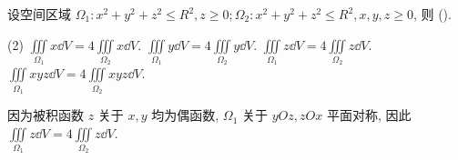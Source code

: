 \begin{example}
    设空间区域 $\Omega_1:x^2+y^2+z^2\leqslant R^2,z\geqslant 0;\Omega_2:x^2+y^2+z^2\leqslant R^2,x,y,z\geqslant 0$, 则 (\quad).
    \begin{tasks}(2)
        \task $\displaystyle \iiint\limits_{\Omega_1}x \dd V=4\iiint\limits_{\Omega_2}x \dd V$.
        \task $\displaystyle \iiint\limits_{\Omega_1}y \dd V=4\iiint\limits_{\Omega_2}y \dd V$.
        \task $\displaystyle \iiint\limits_{\Omega_1}z \dd V=4\iiint\limits_{\Omega_2}z \dd V$.
        \task $\displaystyle \iiint\limits_{\Omega_1}xyz \dd V=4\iiint\limits_{\Omega_2}xyz \dd V$.
    \end{tasks}
\end{example}
\begin{solution}
    因为被积函数 $z$ 关于 $x,y$ 均为偶函数, $\Omega_1$ 关于 $yOz,zOx$ 平面对称, 因此 $\displaystyle \iiint\limits_{\Omega_1}z \dd V=4\iiint\limits_{\Omega_2}z \dd V$.
\end{solution}

